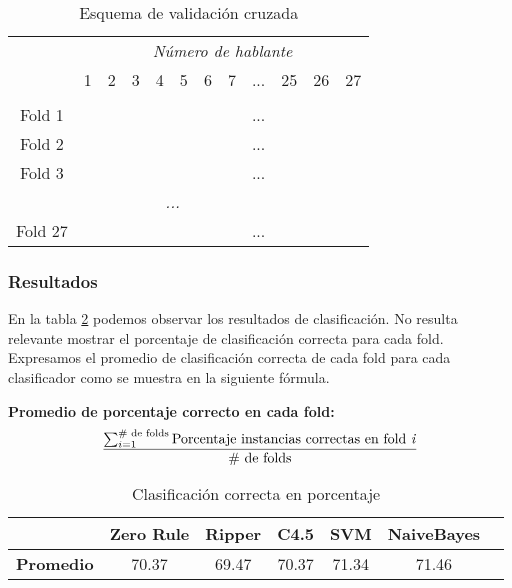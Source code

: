 \begin{table}[H]
	\centering
	\begin{tabular}{cccccccccccc}
		& \multicolumn{11}{c}{\textit{Número de hablante}} \\
		& 1 & 2 & 3 & 4 & 5 & 6 & 7 & ... & 25 & 26 & 27 \\
		\hline \\
		Fold 1 &\mycirc[red] & \mycirc[blue] & \mycirc[blue]  & \mycirc[blue]  & \mycirc[blue]  & \mycirc[blue]  & \mycirc[blue] & ... & \mycirc[blue] & \mycirc[blue] & \mycirc[blue]  \\
		
		Fold 2 &\mycirc[blue] & \mycirc[red] & \mycirc[blue]  & \mycirc[blue]  & \mycirc[blue]  & \mycirc[blue]  & \mycirc[blue] & ... & \mycirc[blue] & \mycirc[blue] & \mycirc[blue]  \\
		
		Fold 3 &\mycirc[blue] & \mycirc[blue] & \mycirc[red]  & \mycirc[blue]  & \mycirc[blue]  & \mycirc[blue]  & \mycirc[blue] & ... & \mycirc[blue] & \mycirc[blue] & \mycirc[blue]  \\
	
		\multicolumn{11}{c}{\textit{...}}	\\
		
		Fold 27 &\mycirc[blue] & \mycirc[blue] & \mycirc[blue]  & \mycirc[blue]  & \mycirc[blue]  & \mycirc[blue]  & \mycirc[blue] & ... & \mycirc[blue] & \mycirc[blue] & \mycirc[red]   \\
	
	\end{tabular}
	\caption{Esquema de validación cruzada}
	\label{HPTDT_esq_cv}
\end{table}
		
\subsubsection{Resultados}

En la tabla \ref{ClasxMuestra_prom_procCorrect} podemos observar los resultados de clasificación. No resulta relevante mostrar el porcentaje de clasificación correcta para cada fold. Expresamos el promedio de clasificación correcta de cada fold para cada clasificador como se muestra en la siguiente fórmula.

\textbf{Promedio de porcentaje correcto en cada fold:}
\[
{ \sum_{i=1}^{\text{\# de folds}} \text{Porcentaje instancias correctas en fold \textit{i}}
	\over
	\text{\# de folds}
}
\]

\begin{table}[H]
	\centering
	\begin{tabular}{|l|c|c|c|c|c|c|}
		\hline
		\textbf{}  & \textbf{Zero Rule} & \textbf{Ripper} & \textbf{C4.5} & \textbf{SVM} & \textbf{NaiveBayes} \\ \hline
		\textbf{Promedio} & 70.37  & 69.47 & 70.37 & 71.34 & 71.46 \\ \hline
	\end{tabular}
	\caption{Clasificación correcta en porcentaje}
	\label{ClasxMuestra_prom_procCorrect}
\end{table}

